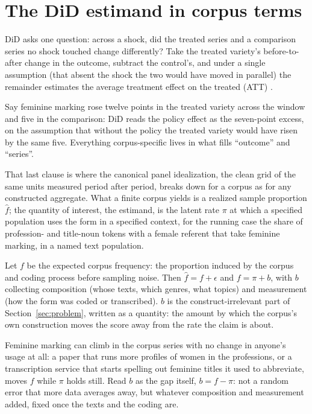 \section{The DiD estimand in corpus terms}
\label{sec:estimand}

DiD asks one question: across a shock, did the treated series and a comparison series no shock touched change differently? Take the treated variety's before-to-after change in the outcome, subtract the control's, and under a single assumption (that absent the shock the two would have moved in parallel) the remainder estimates the average treatment effect on the treated (ATT) \citep{RothSantAnnaBilinskiPoe2023}.

Say feminine marking rose twelve points in the treated variety across the window and five in the comparison: DiD reads the policy effect as the seven-point excess, on the assumption that without the policy the treated variety would have risen by the same five. Everything corpus-specific lives in what fills \enquote{outcome} and \enquote{series}.

That last clause is where the canonical panel idealization, the clean grid of the same units measured period after period, breaks down for a corpus as for any constructed aggregate. What a finite corpus yields is a realized sample proportion $\hat f$; the quantity of interest, the estimand, is the latent rate $\pi$ at which a specified population uses the form in a specified context, for the running case the share of profession- and title-noun tokens with a female referent that take feminine marking, in a named text population.

Let $f$ be the expected corpus frequency: the proportion induced by the corpus and coding process before sampling noise. Then $\hat f = f + \epsilon$ and $f = \pi + b$, with $b$ collecting composition (whose texts, which genres, what topics) and measurement (how the form was coded or transcribed). $b$ is the construct-irrelevant part of Section~\ref{sec:problem}, written as a quantity: the amount by which the corpus's own construction moves the score away from the rate the claim is about.

Feminine marking can climb in the corpus series with no change in anyone's usage at all: a paper that runs more profiles of women in the professions, or a transcription service that starts spelling out feminine titles it used to abbreviate, moves $f$ while $\pi$ holds still. Read $b$ as the gap itself, $b = f - \pi$: not a random error that more data averages away, but whatever composition and measurement added, fixed once the texts and the coding are.

